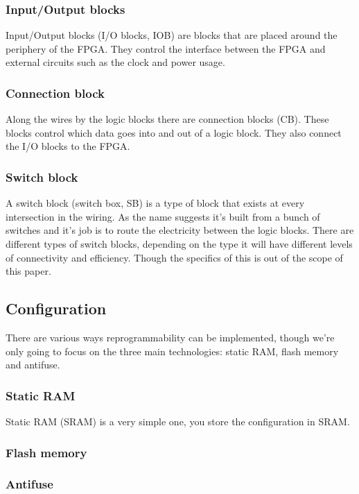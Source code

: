 \documentclass{paper}
\begin{document}
\subsubsection{Input/Output blocks}
Input/Output blocks (I/O blocks, IOB) are blocks that are placed around the
periphery of the FPGA. They control the interface between the FPGA and external
circuits such as the clock and power usage.

\subsubsection{Connection block}
Along the wires by the logic blocks there are connection blocks (CB). These blocks
control which data goes into and out of a logic block. They also connect the
I/O blocks to the FPGA.

\subsubsection{Switch block}
A switch block (switch box, SB) is a type of block that exists at every intersection in the wiring.
As the name suggests it's built from a bunch of switches and it's job is to
route the electricity between the logic blocks. There are different types of
switch blocks, depending on the type it will have different levels of
connectivity and efficiency. Though the specifics of this is out of the scope
of this paper.


\subsection{Configuration}
There are various ways reprogrammability can be implemented, though we're only
going to focus on the three main technologies: static RAM, flash memory and
antifuse.

\subsubsection{Static RAM}
Static RAM (SRAM) is a very simple one, you store the configuration in SRAM.

\subsubsection{Flash memory}
\subsubsection{Antifuse}

\printbibliography
\end{document}
